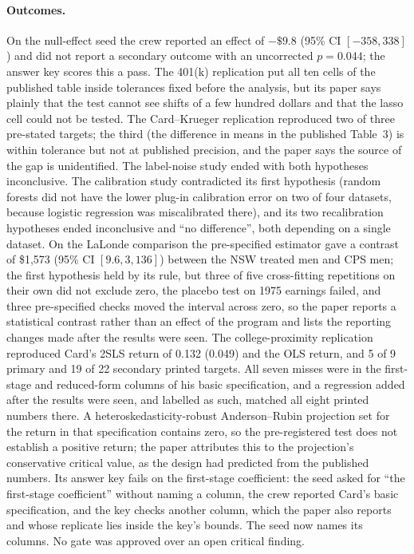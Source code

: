 \documentclass[11pt]{article}
\begin{document}
\paragraph{Outcomes.} On the null-effect seed the crew reported an effect of $-\$9.8$
(95\% CI $[-358, 338]$) and did not report a secondary outcome with an uncorrected
$p = 0.044$; the answer key scores this a pass. The 401(k) replication put all ten
cells of the published table inside tolerances fixed before the analysis, but its paper
says plainly that the test cannot see shifts of a few hundred dollars and that the lasso
cell could not be tested. The Card--Krueger replication reproduced two of three
pre-stated targets; the third (the difference in means in the published Table~3) is
within tolerance but not at published precision, and the paper says the source of the
gap is unidentified. The label-noise study ended with both hypotheses inconclusive. The calibration study
contradicted its first hypothesis (random forests did not have the lower plug-in
calibration error on two of four datasets, because logistic regression was
miscalibrated there), and its two recalibration hypotheses ended inconclusive and ``no
difference'', both depending on a single dataset. On the LaLonde comparison the
pre-specified estimator gave a contrast of \$1,573 (95\% CI $[9.6, 3{,}136]$) between
the NSW treated men and CPS men; the first hypothesis held by its rule, but three of
five cross-fitting repetitions on their own did not exclude zero, the placebo test on
1975 earnings failed, and three pre-specified checks moved the interval across zero, so
the paper reports a statistical contrast rather than an effect of the program and lists
the reporting changes made after the results were seen. The college-proximity
replication reproduced Card's 2SLS return of 0.132 (0.049) and the OLS return, and 5 of
9 primary and 19 of 22 secondary printed targets. All seven misses were in the
first-stage and reduced-form columns of his basic specification, and a regression
added after the results were seen, and labelled as such, matched all eight printed
numbers there. A heteroskedasticity-robust Anderson--Rubin projection set for the return
in that specification contains zero, so the pre-registered test does not establish a
positive return; the paper attributes this to the projection's conservative critical
value, as the design had predicted from the published numbers. Its answer key fails on
the first-stage coefficient: the seed asked for ``the first-stage coefficient'' without
naming a column, the crew reported Card's basic specification, and the key checks
another column, which the paper also reports and whose replicate lies inside the key's
bounds. The seed now names its columns. No gate was approved over an
open critical finding.
\end{document}

